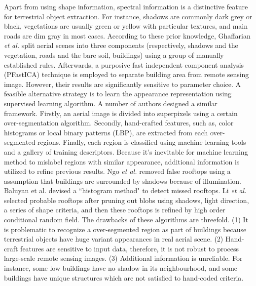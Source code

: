 \documentclass[runningheads]{llncs}
\begin{document}
   Apart from using shape information, spectral information is a distinctive feature for  terrestrial object extraction. For instance, shadows are commonly dark grey or black, vegetations are usually green or yellow with particular textures, and main roads are dim gray in most cases. According to these prior knowledge, Ghaffarian \textit{et al.} \cite{ghaffarian2014automaticPFICA} split aerial scenes into three components (respectively, shadows and the vegetation, roads and the bare soil, buildings) using a group of manually established rules. Afterwards, a purposive fast independent component analysis (PFastICA) technique is employed to separate building area from remote sensing image. However, their results are significantly sensitive to parameter choice. A feasible alternative strategy is to learn the appearance representation using  supervised learning algorithm. A number of authors \cite{chen2014shadow,ngoautomatic,baluyan2013novel,dornaika2015object} designed a similar framework. Firstly, an aerial image is divided into superpixels using  a certain over-segmentation algorithm. Secondly, hand-crafted features, such as, color histograms or local binary patterns (LBP), are extracted from each over-segmented regions. Finally, each region is classified using machine learning tools and a gallery of training descriptors.  Because it's inevitable for machine learning method to mislabel regions with similar appearance, additional information is utilized to refine previous results. Ngo \textit{et
al.} \cite{ngoautomatic} removed false rooftops using a assumption that buildings are surrounded by shadows because of illumination. Baluyan et al. \cite{baluyan2013novel} devised a ``histogram method" to detect missed rooftops. Li \textit{et al.} \cite{li2015robust} selected probable rooftops after pruning out blobs using shadows, light direction, a series of shape criteria, and then these rooftops is refined by high order conditional random field. The drawbacks of these algorithms are threefold. (1) It is problematic to recognize a over-segmented region as part of buildings because terrestrial objects have huge variant appearances in real aerial scene. (2) Hand-craft features are sensitive to input data, therefore, it is not robust to process large-scale remote sensing images. (3) Additional information is unreliable. For instance, some low buildings have no shadow in its neighbourhood, and some buildings have unique structures which are not satisfied to hand-coded criteria. 
\end{document}

